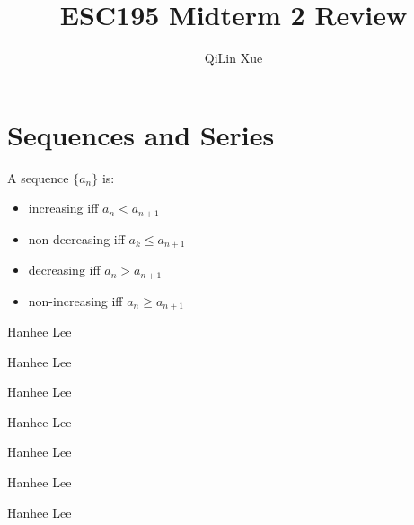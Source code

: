 \documentclass{article}
\title{ESC195 Midterm 2 Review}
\author{QiLin Xue}
\begin{document}
    \maketitle
    \tableofcontents
    \section{Sequences and Series}
    A sequence $\{a_n\}$ is:
        \begin{itemize}
            \item increasing iff $a_n < a_{n+1}$
            \item non-decreasing iff $a_k \le a_{n+1}$
            \item decreasing iff $a_n > a_{n+1}$
            \item non-increasing iff $a_n \ge a_{n+1}$
        \end{itemize}
\begin{mnemonic}
    Hanhee Lee
\end{mnemonic}
\begin{example}
    Hanhee Lee
\end{example}
\begin{definition}
    Hanhee Lee 
\end{definition}
\begin{theorem}
    Hanhee Lee
\end{theorem}
\begin{derivation}
    Hanhee Lee
\end{derivation}
\begin{intuition}
    Hanhee Lee
\end{intuition}
\begin{warning}
    Hanhee Lee
\end{warning}
\end{document}
